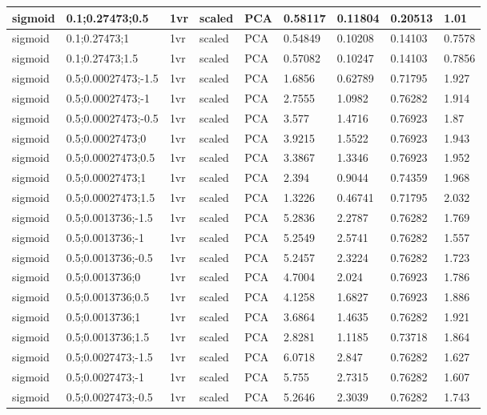 \begin{longtable}{lllllllll}
sigmoid & 0.1;0.27473;0.5 & 1vr & scaled & PCA & 0.58117 & 0.11804 & 0.20513 & 1.01\\ \hline
sigmoid & 0.1;0.27473;1 & 1vr & scaled & PCA & 0.54849 & 0.10208 & 0.14103 & 0.7578\\ \hline
sigmoid & 0.1;0.27473;1.5 & 1vr & scaled & PCA & 0.57082 & 0.10247 & 0.14103 & 0.7856\\ \hline
sigmoid & 0.5;0.00027473;-1.5 & 1vr & scaled & PCA & 1.6856 & 0.62789 & 0.71795 & 1.927\\ \hline
sigmoid & 0.5;0.00027473;-1 & 1vr & scaled & PCA & 2.7555 & 1.0982 & 0.76282 & 1.914\\ \hline
sigmoid & 0.5;0.00027473;-0.5 & 1vr & scaled & PCA & 3.577 & 1.4716 & 0.76923 & 1.87\\ \hline
sigmoid & 0.5;0.00027473;0 & 1vr & scaled & PCA & 3.9215 & 1.5522 & 0.76923 & 1.943\\ \hline
sigmoid & 0.5;0.00027473;0.5 & 1vr & scaled & PCA & 3.3867 & 1.3346 & 0.76923 & 1.952\\ \hline
sigmoid & 0.5;0.00027473;1 & 1vr & scaled & PCA & 2.394 & 0.9044 & 0.74359 & 1.968\\ \hline
sigmoid & 0.5;0.00027473;1.5 & 1vr & scaled & PCA & 1.3226 & 0.46741 & 0.71795 & 2.032\\ \hline
sigmoid & 0.5;0.0013736;-1.5 & 1vr & scaled & PCA & 5.2836 & 2.2787 & 0.76282 & 1.769\\ \hline
sigmoid & 0.5;0.0013736;-1 & 1vr & scaled & PCA & 5.2549 & 2.5741 & 0.76282 & 1.557\\ \hline
sigmoid & 0.5;0.0013736;-0.5 & 1vr & scaled & PCA & 5.2457 & 2.3224 & 0.76282 & 1.723\\ \hline
sigmoid & 0.5;0.0013736;0 & 1vr & scaled & PCA & 4.7004 & 2.024 & 0.76923 & 1.786\\ \hline
sigmoid & 0.5;0.0013736;0.5 & 1vr & scaled & PCA & 4.1258 & 1.6827 & 0.76923 & 1.886\\ \hline
sigmoid & 0.5;0.0013736;1 & 1vr & scaled & PCA & 3.6864 & 1.4635 & 0.76282 & 1.921\\ \hline
sigmoid & 0.5;0.0013736;1.5 & 1vr & scaled & PCA & 2.8281 & 1.1185 & 0.73718 & 1.864\\ \hline
sigmoid & 0.5;0.0027473;-1.5 & 1vr & scaled & PCA & 6.0718 & 2.847 & 0.76282 & 1.627\\ \hline
sigmoid & 0.5;0.0027473;-1 & 1vr & scaled & PCA & 5.755 & 2.7315 & 0.76282 & 1.607\\ \hline
sigmoid & 0.5;0.0027473;-0.5 & 1vr & scaled & PCA & 5.2646 & 2.3039 & 0.76282 & 1.743\\ \hline

\end{longtable}
